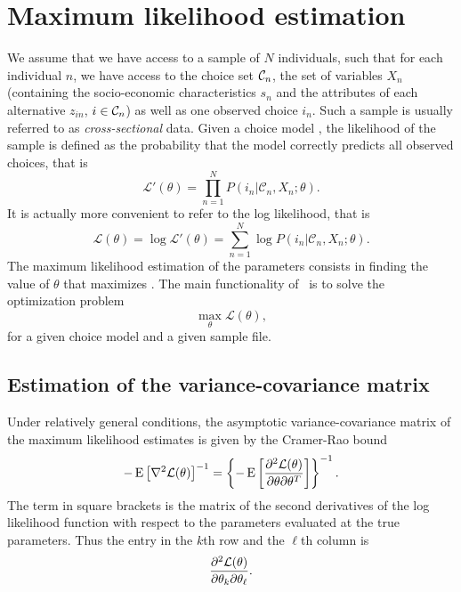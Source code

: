\documentclass[12pt]{memoir}
\begin{document}
 \section{Maximum likelihood estimation}

We assume that we have access to a sample of $N$ individuals, such
that for each individual $n$, we have access to the choice set $\mathcal{C}_n$,
the set of variables $X_n$ (containing the socio-economic
characteristics $s_n$ and the attributes of each
alternative $z_{in}$, $i\in\mathcal{C}_n$) as well as one observed choice
$i_n$. Such a sample is usually referred to as \emph{cross-sectional} data.
Given a choice model , the likelihood of the
sample is defined as the probability that the model correctly predicts
all observed choices, that is
\begin{equation}
    \mathcal{L}'(\theta)= \prod_{n=1}^N  P(i_n|\mathcal{C}_n, X_n; \theta).
\end{equation}
It is actually more convenient to refer to the log likelihood, that is 
\begin{equation}
\label{eq:logLikelihood}
    \mathcal{L}(\theta)=\log \mathcal{L}'(\theta) =  \sum_{n=1}^N \log P(i_n|\mathcal{C}_n, X_n; \theta).
\end{equation}
The maximum likelihood estimation of the parameters consists in
finding the value of $\theta$ that maximizes
. The main functionality of \BIOGEME\ is to
solve the optimization problem
\begin{equation}
\max_{\theta}\mathcal{L}(\theta),
\end{equation}
for a given choice model and a given sample file. 

   
   \subsection{Estimation of the  variance-covariance matrix}
   \label{sec:robust}
Under relatively general conditions,  the asymptotic
variance-covariance matrix of the maximum likelihood
estimates is given by the Cramer-Rao bound
\begin{equation}
  \label{eq:RaoCramer}
  -\operatorname{E}\left[ \nabla^2 \mathcal{L}(\theta)\right]^{-1} =  \left\{-\operatorname{E}\left[\frac{\partial^2 \mathcal{L}(\theta)}{\partial \theta \partial \theta^T}\right]\right\}^{-1}.
\end{equation}
The term in square brackets is the matrix of the second derivatives
of the log likelihood function with respect to the parameters
evaluated at the true parameters.  Thus the entry in the $k$\/th row and
the $\ell$\/th column is
\begin{equation}
  \label{eq:BAL4.34}
 \frac{\partial^2 \mathcal{L}(\theta)}{\partial \theta_k \partial \theta_{\ell}}.
\end{equation}
\end{document}
